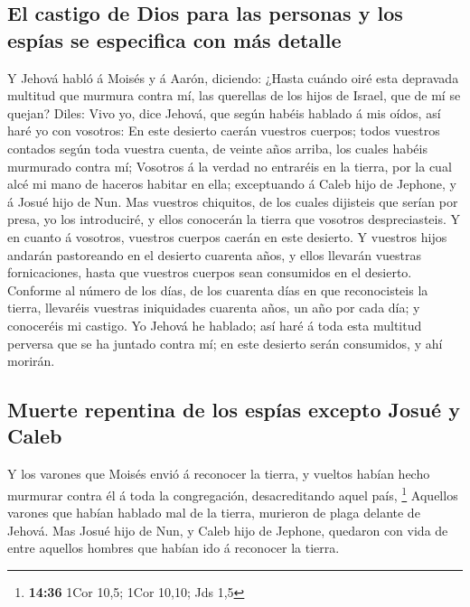 \hypertarget{el-castigo-de-dios-para-las-personas-y-los-espuxedas-se-especifica-con-muxe1s-detalle}{%
\subsection{El castigo de Dios para las personas y los espías se
especifica con más
detalle}\label{el-castigo-de-dios-para-las-personas-y-los-espuxedas-se-especifica-con-muxe1s-detalle}}

 Y Jehová habló á Moisés y á Aarón, diciendo:
 ¿Hasta cuándo oiré esta depravada multitud que murmura
contra mí, las querellas de los hijos de Israel, que de mí se quejan?
 Diles: Vivo yo, dice Jehová, que según habéis hablado á
mis oídos, así haré yo con vosotros:  En este desierto
caerán vuestros cuerpos; todos vuestros contados según toda vuestra
cuenta, de veinte años arriba, los cuales habéis murmurado contra mí;
 Vosotros á la verdad no entraréis en la tierra, por la
cual alcé mi mano de haceros habitar en ella; exceptuando á Caleb hijo
de Jephone, y á Josué hijo de Nun.  Mas vuestros
chiquitos, de los cuales dijisteis que serían por presa, yo los
introduciré, y ellos conocerán la tierra que vosotros despreciasteis.
 Y en cuanto á vosotros, vuestros cuerpos caerán en este
desierto.  Y vuestros hijos andarán pastoreando en el
desierto cuarenta años, y ellos llevarán vuestras fornicaciones, hasta
que vuestros cuerpos sean consumidos en el desierto. 
Conforme al número de los días, de los cuarenta días en que
reconocisteis la tierra, llevaréis vuestras iniquidades cuarenta años,
un año por cada día; y conoceréis mi castigo.  Yo Jehová
he hablado; así haré á toda esta multitud perversa que se ha juntado
contra mí; en este desierto serán consumidos, y ahí morirán.

\hypertarget{muerte-repentina-de-los-espuxedas-excepto-josuuxe9-y-caleb}{%
\subsection{Muerte repentina de los espías excepto Josué y
Caleb}\label{muerte-repentina-de-los-espuxedas-excepto-josuuxe9-y-caleb}}

 Y los varones que Moisés envió á reconocer la tierra, y
vueltos habían hecho murmurar contra él á toda la congregación,
desacreditando aquel país, \footnote{\textbf{14:36} 1Cor 10,5; 1Cor
  10,10; Jds 1,5}  Aquellos varones que habían hablado
mal de la tierra, murieron de plaga delante de Jehová. 
Mas Josué hijo de Nun, y Caleb hijo de Jephone, quedaron con vida de
entre aquellos hombres que habían ido á reconocer la tierra.

